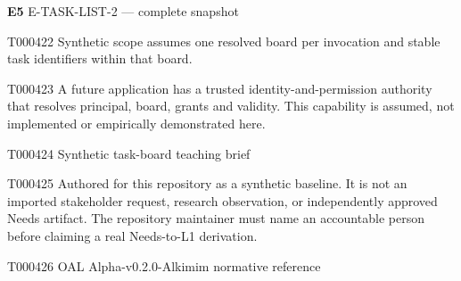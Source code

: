 \documentclass[11pt,a4paper]{article}
\begin{document}
\noindent\textbf{E5} E-TASK-LIST-2 --- complete snapshot\par
\endgroup
\clearpage
\begin{atlasparagraph}{T000422}
Synthetic scope assumes one resolved board per invocation and stable task identifiers within that board.
\end{atlasparagraph}
\begin{atlasparagraph}{T000423}
A future application has a trusted identity-and-permission authority that resolves principal, board, grants and validity. This capability is assumed, not implemented or empirically demonstrated here.
\end{atlasparagraph}
\begin{atlastext}{T000424}
Synthetic task-board teaching brief
\end{atlastext}
\begin{atlasparagraph}{T000425}
Authored for this repository as a synthetic baseline. It is not an imported stakeholder request, research observation, or independently approved Needs artifact. The repository maintainer must name an accountable person before claiming a real Needs-to-L1 derivation.
\end{atlasparagraph}
\begin{atlastext}{T000426}
OAL Alpha-v0.2.0-Alkimim normative reference
\end{atlastext}
\end{document}

